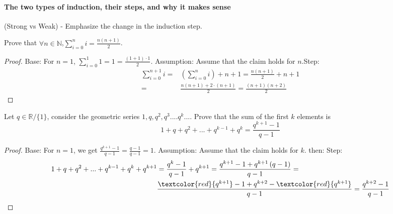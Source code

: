 \paragraph{The two types of induction, their steps, and why it makes sense} (Strong vs Weak) - Emphasize the change in the induction step.
\begin{example} Prove that $ \forall n \in  \mathbb{N}$,$\sum_{i=0}^{n}{i} = \frac{n(n+1)}{2}$.
\begin{proof} Base: For \(n = 1\), \(\sum_{i=0}^{1}{1} = 1 = \frac{(1+1)\cdot 1}{2} \). Assumption: Assume that the claim holds for \(n\).Step: 
\begin{equation*}
  \begin{split}
 \sum_{i=0}^{n+1}{i} = & \left( \sum_{i=0}^{n}{i} \right) + n+1 = \frac{n(n+1)}{2} + n + 1 \\
 = & \frac{n(n+1) + 2\cdot (n+1)}{2} = \frac{(n+1)(n+2)}{2} 
  \end{split}
\end{equation*}
\end{proof}
\end{example}
\begin{example} Let \(q\in \mathbb{R} / \{1\}\), consider the geometric series \( 1,q,q^2,q^3....q^k...\). Prove that the sum of the first \(k\) elements is \begin{equation*}
     1+q+q^2+...+q^{k-1}+q^k = \frac{q^{k+1}-1}{q-1}
\end{equation*}

\begin{proof} Base: For \(n = 1\), we get \( \frac{q^{k+1}-1}{q-1} = \frac{q-1}{q-1} = 1\). 
Assumption: Assume that the claim holds for \(k\). then:
Step: 
\begin{equation*}
\begin{split}
    1+q+q^2+...+q^{k-1}+q^k + q^{k+1} &=  \frac{q^{k}-1}{q-1} + q^{k+1}  = \frac{q^{k+1}-1 +q^{k+1}\left(q-1\right) }{q-1} = \\ &\frac{\textcolor{red}{q^{k+1}}-1 +q^{k+2} - \textcolor{red}{q^{k+1}}  }{q-1} = \frac{q^{k+2}-1}{q-1} 
\end{split}
\end{equation*}
\end{proof}
\end{example}

